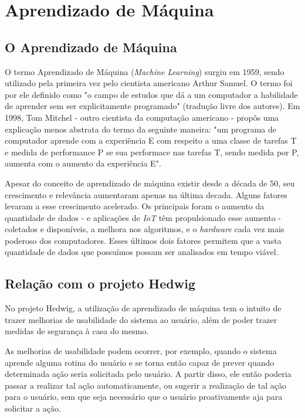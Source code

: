 \chapter{Aprendizado de Máquina}

	\section{O Aprendizado de Máquina}
		O termo Aprendizado de Máquina (\emph{Machine Learning}) surgiu em 1959, sendo utilizado pela primeira vez  pelo cientista americano Arthur Samuel. O termo foi por ele definido como "o campo de estudos que dá a um computador a habilidade de aprender sem ser explicitamente programado" (tradução livre dos autores). Em 1998, Tom Mitchel - outro cientista da computação americano - propôs uma explicação menos abstrata do termo da seguinte maneira: "um programa de computador aprende com a experiência E com respeito a uma classe de tarefas T e medida de performance P se sua performace nas tarefas T, sendo medida por P, aumenta com o aumento da experiência E".

		Apesar do conceito de aprendizado de máquina existir desde a década de 50, seu crescimento e relevância aumentaram apenas na última decada. Alguns fatores levaram a esse crescimento acelerado. Os principais foram o aumento da quantidade de dados - e aplicações de \emph{IoT} têm propulsionado esse aumento - coletados e disponíveis, a melhora nos algoritmos, e o \emph{hardware} cada vez mais poderoso dos computadores. Esses últimos dois fatores permitem que a vasta quantidade de dados que possuímos possam ser analisados em tempo viável.

	\section{Relação com o projeto Hedwig}
		No projeto Hedwig, a utilização de aprendizado de máquina tem o intuito de trazer melhorias de usabilidade do sistema ao usuário, além de poder trazer medidas de segurança à casa do mesmo.

		As melhorias de usabilidade podem ocorrer, por exemplo, quando o sistema aprende alguma rotina do usuário e se torna então capaz de prever quando determinada ação seria solicitada pelo usuário. A partir disso, ele então poderia passar a realizar tal ação automaticamente, ou sugerir a realização de tal ação para o usuário, sem que seja necessário que o usuário proativamente aja para solicitar a ação.

